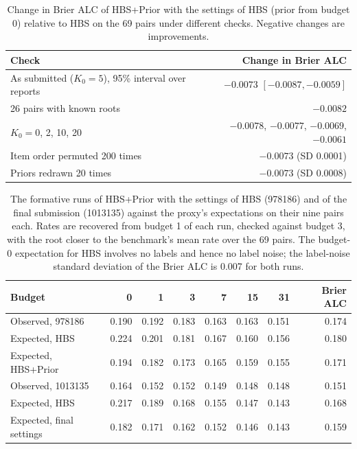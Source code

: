 \documentclass{article}
\newcommand{\finalid}{1013135}
\begin{document}
\begin{table}[ht]
  \caption{Change in Brier ALC of HBS+Prior with the settings of HBS (prior from budget 0) relative to HBS on the 69 pairs under different checks. Negative changes are improvements.}
  \label{tab:prior_robust}
  \centering
  \small
  \begin{tabular}{lr}
    \toprule
    Check & Change in Brier ALC \\
    \midrule
    As submitted ($K_0 = 5$), 95\% interval over reports & $-0.0073$ $[-0.0087, -0.0059]$ \\
    26 pairs with known roots & $-0.0082$ \\
    $K_0 = 0$, 2, 10, 20 & $-0.0078$, $-0.0077$, $-0.0069$, $-0.0061$ \\
    Item order permuted 200 times & $-0.0073$ (SD 0.0001) \\
    Priors redrawn 20 times & $-0.0073$ (SD 0.0008) \\
    \bottomrule
  \end{tabular}
\end{table}

\begin{table}[ht]
  \caption{The formative runs of HBS+Prior with the settings of HBS (978186) and of the final submission (1013135) against the proxy's expectations on their nine pairs each. Rates are recovered from budget 1 of each run, checked against budget 3, with the root closer to the benchmark's mean rate over the 69 pairs. The budget-0 expectation for HBS involves no labels and hence no label noise; the label-noise standard deviation of the Brier ALC is 0.007 for both runs.}
  \label{tab:final_run}
  \centering
  \small
  \begin{tabular}{lrrrrrrr}
    \toprule
    Budget & 0 & 1 & 3 & 7 & 15 & 31 & Brier ALC \\
    \midrule
    Observed, 978186 & 0.190 & 0.192 & 0.183 & 0.163 & 0.163 & 0.151 & 0.174 \\
    Expected, HBS & 0.224 & 0.201 & 0.181 & 0.167 & 0.160 & 0.156 & 0.180 \\
    Expected, HBS+Prior & 0.194 & 0.182 & 0.173 & 0.165 & 0.159 & 0.155 & 0.171 \\
    \midrule
    Observed, \finalid & 0.164 & 0.152 & 0.152 & 0.149 & 0.148 & 0.148 & 0.151 \\
    Expected, HBS & 0.217 & 0.189 & 0.168 & 0.155 & 0.147 & 0.143 & 0.168 \\
    Expected, final settings & 0.182 & 0.171 & 0.162 & 0.152 & 0.146 & 0.143 & 0.159 \\
    \bottomrule
  \end{tabular}
\end{table}
\end{document}
